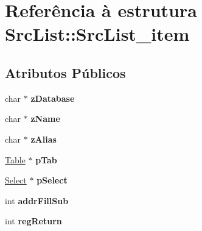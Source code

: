 \hypertarget{struct_src_list_1_1_src_list__item}{\section{Referência à estrutura Src\-List\-:\-:Src\-List\-\_\-item}
\label{struct_src_list_1_1_src_list__item}
}
\subsection*{Atributos Públicos}
\begin{DoxyCompactItemize}
\item 
\hypertarget{struct_src_list_1_1_src_list__item_a2f7bf0921794dc46d74d2546fc10f7de}{char $\ast$ {\bfseries z\-Database}}\label{struct_src_list_1_1_src_list__item_a2f7bf0921794dc46d74d2546fc10f7de}

\item 
\hypertarget{struct_src_list_1_1_src_list__item_afee5c5a84594fed8100be3cdb3e3ff1c}{char $\ast$ {\bfseries z\-Name}}\label{struct_src_list_1_1_src_list__item_afee5c5a84594fed8100be3cdb3e3ff1c}

\item 
\hypertarget{struct_src_list_1_1_src_list__item_a461ef8d80828ed8dd4409b9244ae2919}{char $\ast$ {\bfseries z\-Alias}}\label{struct_src_list_1_1_src_list__item_a461ef8d80828ed8dd4409b9244ae2919}

\item 
\hypertarget{struct_src_list_1_1_src_list__item_a8779b2d10d0e25af78ad90e57f9cd4f6}{\hyperlink{struct_table}{Table} $\ast$ {\bfseries p\-Tab}}\label{struct_src_list_1_1_src_list__item_a8779b2d10d0e25af78ad90e57f9cd4f6}

\item 
\hypertarget{struct_src_list_1_1_src_list__item_ab44822fca7618c4f41f4f770ad41425b}{\hyperlink{struct_select}{Select} $\ast$ {\bfseries p\-Select}}\label{struct_src_list_1_1_src_list__item_ab44822fca7618c4f41f4f770ad41425b}

\item 
\hypertarget{struct_src_list_1_1_src_list__item_a1fb4f55d13641e11f07c3e535fd7cf1d}{int {\bfseries addr\-Fill\-Sub}}\label{struct_src_list_1_1_src_list__item_a1fb4f55d13641e11f07c3e535fd7cf1d}

\item 
\hypertarget{struct_src_list_1_1_src_list__item_a67344976677cbbdea271fcdf7be620cc}{int {\bfseries reg\-Return}}\label{struct_src_list_1_1_src_list__item_a67344976677cbbdea271fcdf7be620cc}


\end{DoxyCompactItemize}
